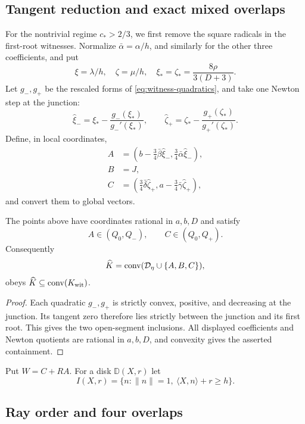 

\subsection{Tangent reduction and exact mixed overlaps}

For the nontrivial regime $c_*>2/3$, we first remove the square radicals in
the first-root witnesses.  Normalize
$\bar\alpha=\alpha/h$, and similarly for the other three coefficients, and
put
\[
 \xi=\lambda/h,\quad \zeta=\mu/h,\quad
 \xi_*=\zeta_*=\frac{8\rho}{3(D+3)}.
\]
Let $g_-,g_+$ be the rescaled forms of
\eqref{eq:witness-quadratics}, and take one Newton step at the junction:
\[
 \widehat\xi_-=\xi_*-\frac{g_-(\xi_*)}{g_-'(\xi_*)},\qquad
 \widehat\zeta_+=\zeta_*-\frac{g_+(\zeta_*)}{g_+'(\zeta_*)}.
\]
Define, in local coordinates,
\begin{align*}
 A&=\left(b-\frac34\bar\beta\widehat\xi_-,
          \frac34\bar\alpha\widehat\xi_-\right),\\
 B&=J,\\
 C&=\left(\frac34\bar\delta\widehat\zeta_+,
          a-\frac34\bar\gamma\widehat\zeta_+\right),
\end{align*}
and convert them to global vectors.

\begin{lemma}
\label{lem:technical-newton-reduction}
The points above have coordinates rational in $a,b,D$ and satisfy
\[
 A\in(Q_0,Q_-),\qquad C\in(Q_0,Q_+).
\]
Consequently
\[
 \widehat K=\mathrm{conv}(\mathcal D_\eta\cup\{A,B,C\}),
\]
obeys $\widehat K\subseteq\mathrm{conv}(K_{\rm wit})$.
\end{lemma}

\begin{proof}
Each quadratic $g_-,g_+$ is strictly convex, positive, and decreasing at
the junction.  Its tangent zero therefore lies strictly between the
junction and its first root.  This gives the two open-segment inclusions.
All displayed coefficients and Newton quotients are rational in $a,b,D$,
and convexity gives the asserted containment.
\end{proof}

Put $W=C+RA$.
For a disk $\mathbb D(X,r)$ let
\[
 I(X,r)=\{n:\lVert n\rVert=1,\ \langle X,n\rangle+r\ge h\}.
\]


\subsection{Ray order and four overlaps}

